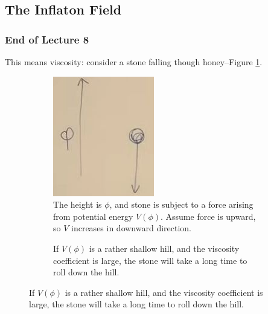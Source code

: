 \documentclass[]{article}
\begin{document}
\subsection{The Inflaton Field}

\subsubsection{End of Lecture 8}
This means viscosity: consider a stone falling though honey--Figure \ref{fig:cosmo-9-falling-stone}.

\begin{figure}[H]
	\caption{Viscosity example--Falling stone}
	\begin{subfigure}[t]{0.45\textwidth}
		\caption{The height is $\phi$, and stone is subject to a force arising from potential energy $V(\phi)$. Assume force is upward, so $V$ increases in downward direction.}\label{fig:cosmo-9-falling-stone}
		\includegraphics[width=\textwidth]{cosmo-9-falling-stone}
	\end{subfigure}
	\begin{subfigure}[t]{0.45\textwidth}
		\caption{If $V(\phi)$ is a rather shallow hill, and the viscosity coefficient is large, the stone will take a long time to roll down the hill.}\label{fig:cosmo-9-falling-shallow-slope}

\end{subfigure}
\end{figure}
\end{document}
